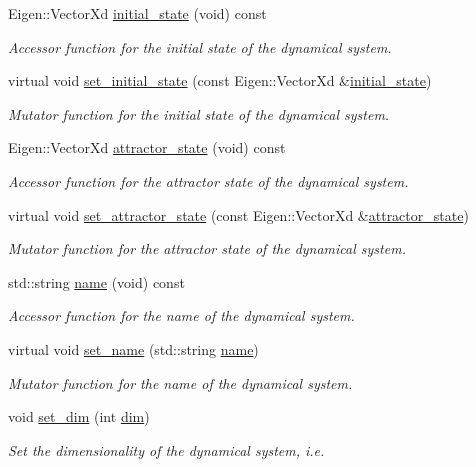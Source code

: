 \begin{DoxyCompactItemize}
Eigen\+::\+Vector\+Xd \hyperlink{group__DynamicalSystems_ga4c7f24e7deec1629548a075015bdc693}{initial\+\_\+state} (void) const 
\begin{DoxyCompactList}\small\item\em Accessor function for the initial state of the dynamical system. \end{DoxyCompactList}\item 
virtual void \hyperlink{group__DynamicalSystems_ga23f05bcccb6a5deda6d2a5364d8ebb16}{set\+\_\+initial\+\_\+state} (const Eigen\+::\+Vector\+Xd \&\hyperlink{group__DynamicalSystems_ga4c7f24e7deec1629548a075015bdc693}{initial\+\_\+state})
\begin{DoxyCompactList}\small\item\em Mutator function for the initial state of the dynamical system. \end{DoxyCompactList}\item 
Eigen\+::\+Vector\+Xd \hyperlink{group__DynamicalSystems_gaebe3c462bc4a725cb17bcc3d13285f13}{attractor\+\_\+state} (void) const 
\begin{DoxyCompactList}\small\item\em Accessor function for the attractor state of the dynamical system. \end{DoxyCompactList}\item 
virtual void \hyperlink{group__DynamicalSystems_ga32a975e60b5f001308368c7f06b90e18}{set\+\_\+attractor\+\_\+state} (const Eigen\+::\+Vector\+Xd \&\hyperlink{group__DynamicalSystems_gaebe3c462bc4a725cb17bcc3d13285f13}{attractor\+\_\+state})
\begin{DoxyCompactList}\small\item\em Mutator function for the attractor state of the dynamical system. \end{DoxyCompactList}\item 
std\+::string \hyperlink{group__DynamicalSystems_gacd23346c798f78014a4f82c853e83c88}{name} (void) const 
\begin{DoxyCompactList}\small\item\em Accessor function for the name of the dynamical system. \end{DoxyCompactList}\item 
virtual void \hyperlink{group__DynamicalSystems_ga5175bca5f98f36690a79e323119a1529}{set\+\_\+name} (std\+::string \hyperlink{group__DynamicalSystems_gacd23346c798f78014a4f82c853e83c88}{name})
\begin{DoxyCompactList}\small\item\em Mutator function for the name of the dynamical system. \end{DoxyCompactList}\item 
void \hyperlink{group__DynamicalSystems_ga9000562e645149d75717458a97db6ff5}{set\+\_\+dim} (int \hyperlink{group__DynamicalSystems_ga6f628f7f4ed9d77bf69f5b8560b98f18}{dim})
\begin{DoxyCompactList}\small\item\em Set the dimensionality of the dynamical system, i.\+e. \end{DoxyCompactList}\end{DoxyCompactItemize}


